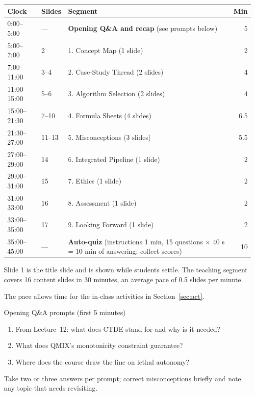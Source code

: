 \documentclass[11pt]{article}
\begin{document}
\begin{center}\small\renewcommand{\arraystretch}{1.2}\begin{tabularx}{\textwidth}{@{}l l X r@{}}\toprule\textbf{Clock} & \textbf{Slides} & \textbf{Segment} & \textbf{Min}\\\midrule

0:00--5:00 & --- & \textbf{Opening Q\&A and recap} (see prompts below) & 5\\

5:00--7:00 & 2 & 1. Concept Map (1 slide) & 2\\

7:00--11:00 & 3--4 & 2. Case-Study Thread (2 slides) & 4\\

11:00--15:00 & 5--6 & 3. Algorithm Selection (2 slides) & 4\\

15:00--21:30 & 7--10 & 4. Formula Sheets (4 slides) & 6.5\\

21:30--27:00 & 11--13 & 5. Misconceptions (3 slides) & 5.5\\

27:00--29:00 & 14 & 6. Integrated Pipeline (1 slide) & 2\\

29:00--31:00 & 15 & 7. Ethics (1 slide) & 2\\

31:00--33:00 & 16 & 8. Assessment (1 slide) & 2\\

33:00--35:00 & 17 & 9. Looking Forward (1 slide) & 2\\

35:00--45:00 & --- & \textbf{Auto-quiz} (instructions 1 min, 15 questions $\times$ 40 s = 10 min of answering; collect scores) & 10\\\bottomrule\end{tabularx}\end{center}

Slide 1 is the title slide and is shown while students settle. The teaching segment covers 16 content slides in 30 minutes, an average pace of 0.5 slides per minute. 

The pace allows time for the in-class activities in Section~\ref{sec:act}.

\begin{instr}{Opening Q\&A prompts (first 5 minutes)}\begin{enumerate}\item From Lecture~12: what does CTDE stand for and why is it needed?\item What does QMIX's monotonicity constraint guarantee?\item Where does the course draw the line on lethal autonomy?\end{enumerate}Take two or three answers per prompt; correct misconceptions briefly and note any topic that needs revisiting.\end{instr}
\end{document}

